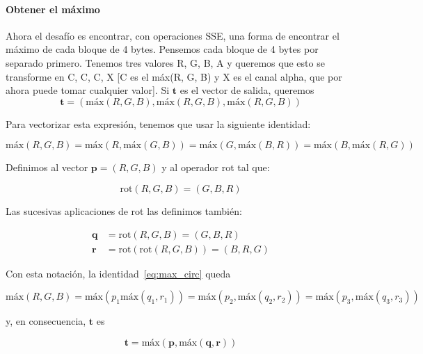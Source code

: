 \paragraph{Obtener el máximo} Ahora el desafío es encontrar, con
operaciones {\ttfamily SSE}, una forma de encontrar el máximo de
cada bloque de 4 bytes. Pensemos cada bloque de 4 bytes por separado
primero. Tenemos tres valores R, G, B, A y queremos que esto se
transforme en C, C, C, X [C es el máx(R, G, B) y X es el canal
alpha, que por ahora puede tomar cualquier valor]. Si $\mathbf{t}$
es el vector de salida, queremos
\begin{equation}
  \mathbf{t} = (\text{máx}(R, G, B), \text{máx}(R, G, B), \text{máx}(R, G, B))
\end{equation}

Para vectorizar esta expresión, tenemos que usar la siguiente identidad:

\begin{equation}
  \text{máx}(R, G, B) = \text{máx}(R, \text{máx}(G, B)) =
  \text{máx}(G, \text{máx}(B, R)) = \text{máx}(B, \text{máx}(R, G))
  \label{eq:max_circ}
\end{equation}

Definimos al vector $\mathbf{p} = (R, G, B)$ y al operador
{\ttfamily rot} tal que:

\begin{equation}
  \text{rot}(R, G, B) = (G, B, R) 
\end{equation}

Las sucesivas aplicaciones de {\ttfamily rot} las definimos también: 

\begin{align}
  \mathbf{q} &= \text{rot}(R, G, B) = (G, B, R) \\
  \mathbf{r} &= \text{rot}(\text{rot}(R, G, B)) = (B, R, G)
\end{align}

Con esta notación, la identidad~\ref{eq:max_circ} queda

\begin{equation}
  \text{máx}(R, G, B) = \text{máx}(p_1 \text{máx}(q_1, r_1)) =
  \text{máx}(p_2, \text{máx}(q_2, r_2)) = \text{máx}(p_3, \text{máx}(q_3, r_3))
\end{equation}

y, en consecuencia, $\mathbf{t}$ es

\begin{equation}
  \mathbf{t} = \text{máx}(\mathbf{p}, \text{máx}(\mathbf{q}, \mathbf{r}))
\end{equation}

